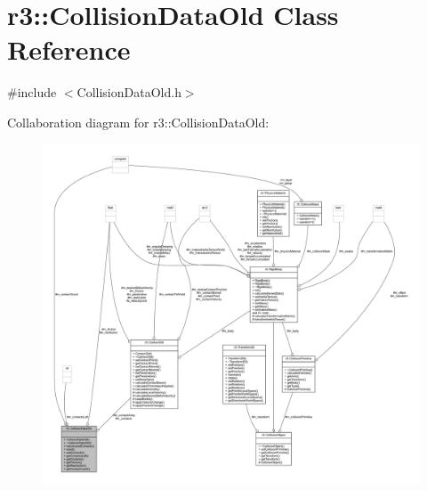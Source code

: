 \hypertarget{classr3_1_1_collision_data_old}{}\section{r3\+:\+:Collision\+Data\+Old Class Reference}
\label{classr3_1_1_collision_data_old}


{\ttfamily \#include $<$Collision\+Data\+Old.\+h$>$}



Collaboration diagram for r3\+:\+:Collision\+Data\+Old\+:\nopagebreak
\begin{figure}[H]
\begin{center}
\leavevmode
\includegraphics[width=350pt]{classr3_1_1_collision_data_old__coll__graph}
\end{center}
\end{figure}
